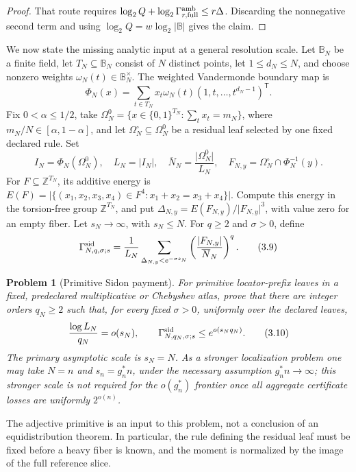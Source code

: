 \documentclass[a4paper,11pt]{amsart}
\newtheorem{problem}[theorem]{Problem}
\theoremstyle{remark}
\newcommand{\B}{\mathbb B}
\newcommand{\Z}{\mathbb Z}
\newcommand{\barN}{\overline N}
\newcommand{\abs}[1]{\lvert#1\rvert}
\begin{document}
\begin{proof}
That route requires
\(\log_2Q+\log_2\Gamma_{r,\mathrm{full}}^{\rm amb}\le r\Delta\).
Discarding the nonnegative second term and using
\(\log_2Q=w\log_2\abs\B\) gives the claim.
\end{proof}

We now state the missing analytic input at a general resolution scale.  Let
\(\B_N\) be a finite field, let \(T_N\subseteq\B_N\) consist of \(N\)
distinct points, let \(1\le d_N\le N\), and choose nonzero weights
\(\omega_N(t)\in\B_N^\times\).  The weighted Vandermonde boundary map is
\[
 \Phi_N(x)=\sum_{t\in T_N}x_t\omega_N(t)
 (1,t,\ldots,t^{d_N-1})^{\mathsf T}.               \tag{3.8}\label{eq:weighted-vandermonde}
\]
Fix \(0<\alpha\le1/2\), take
\(\Omega_N^0=\{x\in\{0,1\}^{T_N}:\sum_tx_t=m_N\}\), where
\(m_N/N\in[\alpha,1-\alpha]\), and let
\(\Omega_N^\circ\subseteq\Omega_N^0\) be a residual leaf selected by one
fixed declared rule.  Set
\[
 I_N=\Phi_N(\Omega_N^0),\quad L_N=\abs{I_N},\quad
 \barN_N=\frac{\abs{\Omega_N^0}}{L_N},\quad
 F_{N,y}=\Omega_N^\circ\cap\Phi_N^{-1}(y).
\]
For \(F\subseteq\Z^{T_N}\), its additive energy is
\(E(F)=\abs{\{(x_1,x_2,x_3,x_4)\in F^4:x_1+x_2=x_3+x_4\}}\).
Compute this energy in the torsion-free group \(\Z^{T_N}\), and put
\(\Delta_{N,y}=E(F_{N,y})/\abs{F_{N,y}}^3\), with value zero for an empty
fiber.  Let \(s_N\to\infty\), with \(s_N\le N\).  For \(q\ge2\) and
\(\sigma>0\), define
\[
 \Gamma^{\rm sid}_{N,q,\sigma;s}
 =\frac1{L_N}\sum_{\Delta_{N,y}<e^{-\sigma s_N}}
   \left(\frac{\abs{F_{N,y}}}{\barN_N}\right)^q.   \tag{3.9}\label{eq:sidon-moment}
\]

\begin{problem}[Primitive Sidon payment]\label{prob:sidon}
For primitive locator-prefix leaves in a fixed, predeclared multiplicative
or Chebyshev atlas, prove that there are integer orders \(q_N\ge2\) such
that, for every fixed \(\sigma>0\), uniformly over the declared leaves,
\[
 \frac{\log L_N}{q_N}=o(s_N),\qquad
 \Gamma^{\rm sid}_{N,q_N,\sigma;s}\le e^{o(s_Nq_N)}. \tag{3.10}\label{eq:sidon-payment}
\]
The primary asymptotic scale is \(s_N=N\).  As a stronger localization
problem one may take \(N=n\) and \(s_n=g_n^*n\), under the necessary
assumption \(g_n^*n\to\infty\); this stronger scale is not required for the
\(o(g_n^*)\) frontier once all aggregate certificate losses are uniformly
\(2^{o(n)}\).
\end{problem}

The adjective primitive is an input to this problem, not a conclusion of an
equidistribution theorem.  In particular, the rule defining the residual leaf
must be fixed before a heavy fiber is known, and the moment is normalized by
the image of the full reference slice.
\end{document}
